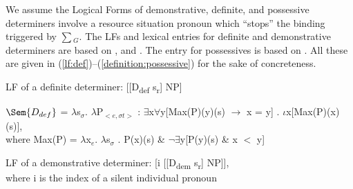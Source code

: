 \documentclass[output=paper,modfonts,nonflat]{langsci/langscibook}
\begin{document}
We assume the Logical Forms of demonstrative, definite, and possessive determiners involve a resource situation pronoun which  ``stops'' the binding triggered by $\sum$$_{G}$. The LFs and lexical entries for definite and demonstrative determiners are based on \citet{Heim:2011,Elbourne:2008}, and \citet{Schwarz:2009}. The entry for possessives is based on \cite{SimonenkoCarlier:2019}. All these are given in (\ref{lf:def})--(\ref{definition:possessive}) for the sake of concreteness.

\ea\label{lf:def} LF of a definite determiner:
[[D\textsubscript{def} s\textsubscript{r}] NP]\\
\z

\ea
$\Sem{D_{def}}$ =  $\lambda$s$_{\sigma}$. $\lambda$P$_{<e,\sigma t>}$ : $\exists$x$\forall$y[Max(P)(y)(s) $\rightarrow$ x = y] . $\iota$x[Max(P)(x)(s)],\\
where Max(P) = $\lambda$x$_{e}$. $\lambda$s$_{\sigma}$ . P(x)(s) \& $\neg\exists$y[P(y)(s) \& x $<$ y] \label{definition:definite}
\z



\ea LF of a demonstrative determiner:
[i [[D\textsubscript{dem} s\textsubscript{r}] NP]],\\
where i is the index of a silent individual pronoun
\z
\end{document}
